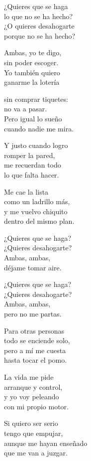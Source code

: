 \begin{lyrics}
¿Quieres que se haga\\
lo que no se ha hecho?\\
¿O quieres desahogarte\\
porque no se ha hecho?

Ambas, yo te digo,\\
sin poder escoger.\\
Yo también quiero\\
ganarme la lotería

sin comprar tiquetes:\\
no va a pasar.\\
Pero igual lo sueño\\
cuando nadie me mira.

Y justo cuando logro\\
romper la pared,\\
me recuerdan todo\\
lo que falta hacer.

Me cae la lista\\
como un ladrillo más,\\
y me vuelvo chiquito\\
dentro del mismo plan.

¿Quieres que se haga?\\
¿Quieres desahogarte?\\
Ambas, ambas,\\
déjame tomar aire.

¿Quieres que se haga?\\
¿Quieres desahogarte?\\
Ambas, ambas,\\
pero no me partas.

Para otras personas\\
todo se enciende solo,\\
pero a mí me cuesta\\
hasta tocar el pomo.

La vida me pide\\
arranque y control,\\
y yo voy peleando\\
con mi propio motor.

Si quiero ser serio\\
tengo que empujar,\\
aunque me hayan enseñado\\
que me van a juzgar.


\end{lyrics}
